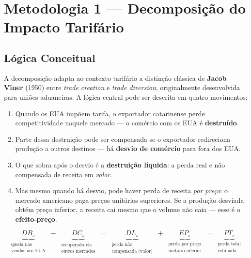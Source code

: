 \documentclass[12pt, a4paper]{article}
\begin{document}
\section{Metodologia 1 --- Decomposição do Impacto Tarifário}
\label{sec:decomp}

\subsection{Lógica Conceitual}

A decomposição adapta ao contexto tarifário a distinção clássica de
\textbf{Jacob Viner} (1950) entre \textit{trade creation} e
\textit{trade diversion}, originalmente desenvolvida para uniões aduaneiras.
A lógica central pode ser descrita em quatro movimentos:

\begin{enumerate}
  \item Quando os EUA impõem tarifa, o exportador catarinense perde
    competitividade naquele mercado --- o comércio com os EUA é
    \textbf{destruído}.
  \item Parte dessa destruição pode ser compensada se o exportador
    redireciona produção a outros destinos ---
    há \textbf{desvio de comércio} para fora dos EUA.
  \item O que sobra após o desvio é a \textbf{destruição líquida}:
    a perda real e não compensada de receita em \textit{valor}.
  \item Mas mesmo quando há desvio, pode haver perda de receita
    \textit{por preço}: o mercado americano paga preços unitários
    superiores. Se a produção desviada obtém preço inferior, a receita
    cai mesmo que o volume não caia --- esse é o \textbf{efeito-preço}.
\end{enumerate}

\begin{formulabox}
\[
\underbrace{DB_s}_{\substack{\text{queda nas}\\[2pt]\text{vendas aos EUA}}}
\;-\;
\underbrace{DC_s}_{\substack{\text{recuperado via}\\[2pt]\text{outros mercados}}}
\;=\;
\underbrace{DL_s}_{\substack{\text{perda não}\\[2pt]\text{compensada (valor)}}}
\;+\;
\underbrace{EP_s}_{\substack{\text{perda por preço}\\[2pt]\text{unitário inferior}}}
\;=\;
\underbrace{PT_s}_{\substack{\text{perda total}\\[2pt]\text{estimada}}}
\]
\end{formulabox}
\end{document}
